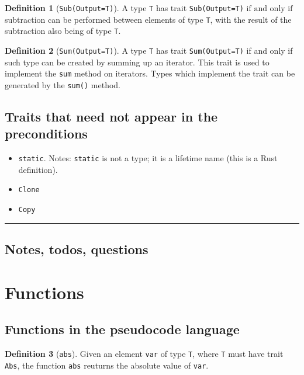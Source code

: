 \documentclass[11pt,a4paper]{article}
\theoremstyle{definition}
\newtheorem{definition}{Definition}[section]
\newcommand{\horizline}{\noindent\rule{\textwidth}{1pt}}
\newcommand{\iffText}{\text{if and only if}}
\begin{document}
\begin{definition}[\texttt{Sub(Output=T)}]
    A type \texttt{T} has trait \texttt{Sub(Output=T)} $\iffText$ subtraction can be performed between elements of type \texttt{T}, with the result of the subtraction also being of type \texttt{T}.
\end{definition}

\begin{definition}[\texttt{Sum(Output=T)}]
    A type \texttt{T} has trait \texttt{Sum(Output=T)} if and only if such type can be created by summing up an iterator. This trait is used to implement the \texttt{sum} method on iterators. Types which implement the trait can be generated by the \texttt{sum()} method. 
\end{definition}

\subsection{Traits that need not appear in the preconditions}
\begin{itemize}
    \item \texttt{\textquotesingle static}. Notes: \texttt{\textquotesingle static} is not a type; it is a lifetime name (this is a Rust definition).
    \item \texttt{Clone}
    \item \texttt{Copy}
\end{itemize}

\horizline

\subsection{Notes, todos, questions}

\section{Functions}

\subsection{Functions in the pseudocode language}

\begin{definition}[\texttt{abs}]
    Given an element \texttt{var} of type \texttt{T}, where \texttt{T} must have trait \texttt{Abs}, the function \texttt{abs} reuturns the absolute value of \texttt{var}.
\end{definition}
\end{document}
